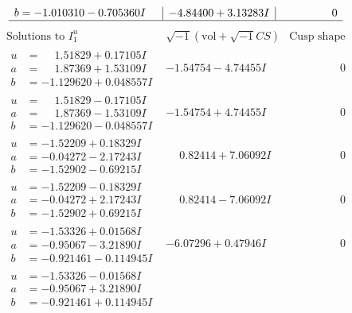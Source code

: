 \documentclass[1p]{elsarticle_modified}
\theoremstyle{definition}
\newcommand{\I}{\sqrt{-1}}
\begin{document}
$$\begin{array}{c|c|c}
\begin{aligned}
b &= -1.010310 - 0.705360 I\end{aligned}
 & -4.84400 + 3.13283 I & \phantom{-0.000000 } 0\\
 \hline 
 \end{array}$$\newpage$$\begin{array}{c|c|c}  
\text{Solutions to }I^u_{1}& \I (\text{vol} + \sqrt{-1}CS) & \text{Cusp shape}\\
 \hline 
\begin{aligned}
u &= \phantom{-}1.51829 + 0.17105 I \\
a &= \phantom{-}1.87369 + 1.53109 I \\
b &= -1.129620 + 0.048557 I\end{aligned}
 & -1.54754 - 4.74455 I & \phantom{-0.000000 } 0 \\ \hline\begin{aligned}
u &= \phantom{-}1.51829 - 0.17105 I \\
a &= \phantom{-}1.87369 - 1.53109 I \\
b &= -1.129620 - 0.048557 I\end{aligned}
 & -1.54754 + 4.74455 I & \phantom{-0.000000 } 0 \\ \hline\begin{aligned}
u &= -1.52209 + 0.18329 I \\
a &= -0.04272 - 2.17243 I \\
b &= -1.52902 - 0.69215 I\end{aligned}
 & \phantom{-}0.82414 + 7.06092 I & \phantom{-0.000000 } 0 \\ \hline\begin{aligned}
u &= -1.52209 - 0.18329 I \\
a &= -0.04272 + 2.17243 I \\
b &= -1.52902 + 0.69215 I\end{aligned}
 & \phantom{-}0.82414 - 7.06092 I & \phantom{-0.000000 } 0 \\ \hline\begin{aligned}
u &= -1.53326 + 0.01568 I \\
a &= -0.95067 - 3.21890 I \\
b &= -0.921461 - 0.114945 I\end{aligned}
 & -6.07296 + 0.47946 I & \phantom{-0.000000 } 0 \\ \hline\begin{aligned}
u &= -1.53326 - 0.01568 I \\
a &= -0.95067 + 3.21890 I \\
b &= -0.921461 + 0.114945 I\end{aligned}

\end{array}$$
\end{document}
